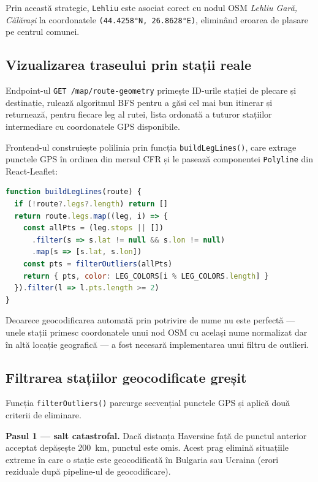 \documentclass[12pt,a4paper]{report}
\begin{document}
Prin această strategie, \texttt{Lehliu} este asociat corect cu nodul OSM \textit{Lehliu Gară, Călărași} la coordonatele \texttt{(44.4258°N, 26.8628°E)}, eliminând eroarea de plasare pe centrul comunei.

\subsection{Vizualizarea traseului prin stații reale}

Endpoint-ul \texttt{GET /map/route-geometry} primește ID-urile stației de plecare și destinație, rulează algoritmul BFS pentru a găsi cel mai bun itinerar și returnează, pentru fiecare leg al rutei, lista ordonată a tuturor stațiilor intermediare cu coordonatele GPS disponibile.

Frontend-ul construiește polilinia prin funcția \texttt{buildLegLines()}, care extrage punctele GPS în ordinea din mersul CFR și le pasează componentei \texttt{Polyline} din React-Leaflet:

\begin{lstlisting}[language=JavaScript, caption=Constructia poliliniei prin statiile intermediare reale]
function buildLegLines(route) {
  if (!route?.legs?.length) return []
  return route.legs.map((leg, i) => {
    const allPts = (leg.stops || [])
      .filter(s => s.lat != null && s.lon != null)
      .map(s => [s.lat, s.lon])
    const pts = filterOutliers(allPts)
    return { pts, color: LEG_COLORS[i % LEG_COLORS.length] }
  }).filter(l => l.pts.length >= 2)
}
\end{lstlisting}

Deoarece geocodificarea automată prin potrivire de nume nu este perfectă --- unele stații primesc coordonatele unui nod OSM cu același nume normalizat dar în altă locație geografică --- a fost necesară implementarea unui filtru de outlieri.

\subsection{Filtrarea stațiilor geocodificate greșit}

Funcția \texttt{filterOutliers()} parcurge secvențial punctele GPS și aplică două criterii de eliminare.

\textbf{Pasul 1 — salt catastrofal.} Dacă distanța Haversine față de punctul anterior acceptat depășește 200~km, punctul este omis. Acest prag elimină situațiile extreme în care o stație este geocodificată în Bulgaria sau Ucraina (erori reziduale după pipeline-ul de geocodificare).
\end{document}
